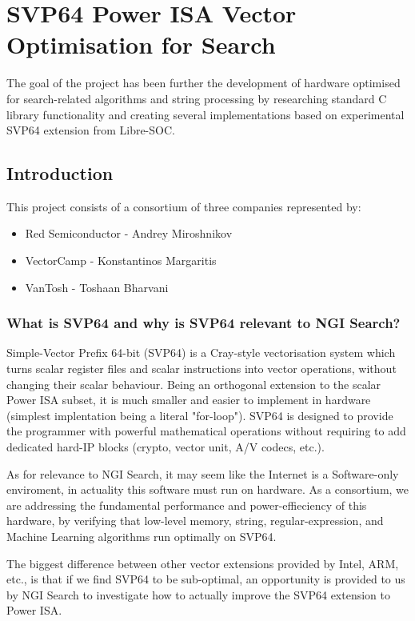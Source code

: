 \chapter{SVP64 Power ISA Vector Optimisation for Search}

The goal of the project has been further the development of hardware
optimised for search-related algorithms and string processing by
researching standard C library functionality and creating several
implementations based on experimental SVP64 extension from Libre-SOC.

\section{Introduction}

This project consists of a consortium of three companies represented by:

\begin{itemize}
  \item Red Semiconductor - Andrey Miroshnikov
  \item VectorCamp - Konstantinos Margaritis
  \item VanTosh - Toshaan Bharvani
\end{itemize}

\subsection{What is SVP64 and why is SVP64 relevant to NGI Search?}

Simple-Vector Prefix 64-bit (SVP64) is a Cray-style vectorisation system which
turns scalar register files and scalar instructions into vector operations,
without changing their scalar behaviour. Being an orthogonal extension to the
scalar Power ISA subset, it is much smaller and easier to implement in
hardware (simplest implentation being a literal "for-loop"). SVP64 is
designed to provide the programmer with powerful mathematical operations
without requiring to add dedicated hard-IP blocks (crypto, vector unit, A/V
codecs, etc.).

As for relevance to NGI Search, it may seem like the Internet is a
Software-only enviroment, in actuality this software must run on hardware.
As a consortium, we are addressing the fundamental performance and
power-effieciency of this hardware, by verifying that low-level memory,
string, regular-expression, and Machine Learning algorithms run optimally
on SVP64.

The biggest difference between other vector extensions provided by Intel,
ARM, etc., is that if we find SVP64 to be sub-optimal, an opportunity is
provided to us by NGI Search to investigate how to actually improve the
SVP64 extension to Power ISA.


